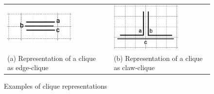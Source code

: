 
\begin{figure}[h]
  \centering
  \begin{tabular}{  p{4cm} p{0.7cm} p{4cm} }
    \includegraphics[width=3.5cm]{img/b0epgTransparenciaGrade2} & &
    \includegraphics[width=3.5cm]{img/b1EpgTransparenteGrade2}
    \\
    \footnotesize %
    (a)  \footnotesize Representation of a clique as edge-clique && \footnotesize (b) Representation  of a clique as claw-clique\\
  \end{tabular}

 \caption{Examples of clique representations} \label{fig:cliquesRepresentation}
\end{figure}